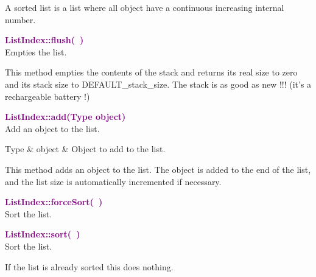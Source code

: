 A sorted list is a list where all object have a continuous increasing internal number.

\textcolor{purple}{\textbf{ListIndex::flush(~)}}\label{ListIndex::flush()}\\
Empties the list.

This method empties the contents of the stack and returns its real size to zero and its stack size to DEFAULT\_stack\_size.
The stack is as good as new !!! (it's a rechargeable battery !)

\textcolor{purple}{\textbf{ListIndex::add(Type object)}}\label{ListIndex::add(Type object)}\\
Add an object to the list.

\begin{tcolorbox}[width=\textwidth,myArgs,tabularx={ll|R}]
Type & object & Object to add to the list.
\end{tcolorbox}

This method adds an object to the list. The object is added to the end of the list, and the list size is automatically incremented if necessary.

\textcolor{purple}{\textbf{ListIndex::forceSort(~)}}\label{ListIndex::forceSort()}\\
Sort the list.


\textcolor{purple}{\textbf{ListIndex::sort(~)}}\label{ListIndex::sort()}\\
Sort the list.

If the list is already sorted this does nothing.

